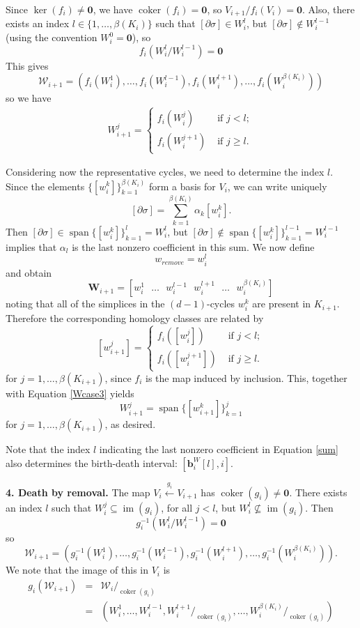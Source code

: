 \documentclass[12pt]{article}
\DeclareMathOperator{\coker}{coker}
\DeclareMathOperator{\im}{im}
\DeclareMathOperator{\spn}{span}
\begin{document}
Since $\ker(f_i) \neq \textbf{0}$, we have $\coker(f_i) = \textbf{0}$, so $V_{i+1}/f_i(V_i) = \textbf{0}$. Also, there exists an index $l \in \{1,\ldots,\beta(K_i) \}$ such that $[\partial\sigma] \in W_i^l$, but $[\partial\sigma] \not\in W_i^{l-1}$ (using the convention $W_i^0 = \textbf{0}$), so
\[ f_i(W_i^l/ W_i^{l-1}) = \textbf{0} \]
This gives
\[ \mathcal{W}_{i+1} = (f_i(W_i^1), \ldots, f_i(W_i^{l-1}), f_i(W_i^{l+1}), \ldots, f_i(W_i^{\beta(K_i)})) \]
so we have
\begin{align}\label{Wcase3}
W_{i+1}^j = \left\{ \begin{array}{ll}
                f_i(W_i^j) & \mbox{ if $j < l$};\\
                f_i(W_i^{j+1}) & \mbox{ if $j \geq l$}.\end{array} \right.
\end{align}

Considering now the representative cycles, we need to determine the index $l$. Since the elements $\{[w_i^k]\}_{k=1}^{\beta(K_i)}$ form a basis for $V_i$, we can write uniquely
\begin{equation}\label{sum}
[\partial\sigma] = \sum_{k=1}^{\beta(K_i)}\alpha_k [w_i^k].
\end{equation}
Then $[\partial\sigma] \in \spn \{[w_i^k]\}_{k=1}^l = W_i^l$, but $[\partial\sigma] \not\in \spn \{[w_i^k]\}_{k=1}^{l-1} = W_i^{l-1}$ implies that $\alpha_l$ is the last nonzero coefficient in this sum. We now define
\[ w_{remove} = w_i^l \]
and obtain
\[ \mathbf{W}_{i+1} =  [w_i^1 \mbox{ } \ldots \mbox{ } w_i^{l-1} \mbox{ } w_i^{l+1} \mbox{ } \ldots \mbox{ } w_i^{\beta(K_i)}] \]
noting that all of the simplices in the $(d-1)$-cycles $w_i^k$ are present in $K_{i+1}$. Therefore the corresponding homology classes are related by
\[ [w_{i+1}^j] = \left\{ \begin{array}{ll}
                f_i([w_i^j]) & \mbox{ if $j < l$};\\
                f_i([w_i^{j+1}]) & \mbox{ if $j \geq l$}.\end{array} \right. \]
for $j = 1,\ldots,\beta(K_{i+1})$, since $f_i$ is the map induced by inclusion. This, together with Equation \ref{Wcase3} yields
\[ W_{i+1}^j = \spn \{[w_{i+1}^k]\}_{k=1}^j \]
for $j = 1,\ldots,\beta(K_{i+1})$, as desired.

Note that the index $l$ indicating the last nonzero coefficient in Equation \ref{sum} also determines the birth-death interval: $[\mathbf{b}_i^W[l],i]$.

\textbf{4. Death by removal.} The map $V_i \overset{g_i}{\longleftarrow} V_{i+1}$ has $\coker(g_i) \neq \textbf{0}$. There exists an index $l$ such that $W_i^j \subseteq \im(g_i)$, for all $j < l$, but $W_i^l \not\subseteq \im(g_i)$. Then
\[ g_i^{-1}(W_i^l/W_i^{l-1}) = \textbf{0} \]
so
\[ \mathcal{W}_{i+1} = (g_i^{-1}(W_i^1), \ldots, g_i^{-1}(W_i^{l-1}), g_i^{-1}(W_i^{l+1}), \ldots, g_i^{-1}(W_i^{\beta(K_i)})). \]
We note that the image of this in $V_i$ is
\begin{eqnarray}\label{gWi}
g_i(\mathcal{W}_{i+1}) & = & \mathcal{W}_i /_{\coker(g_i)}  \\
& = & (W_i^1,\ldots, W_i^{l-1}, W_i^{l+1}/_{\coker(g_i)}, \ldots, W_i^{\beta(K_i)}/_{\coker(g_i)} ) \nonumber
\end{eqnarray}
\end{document}
